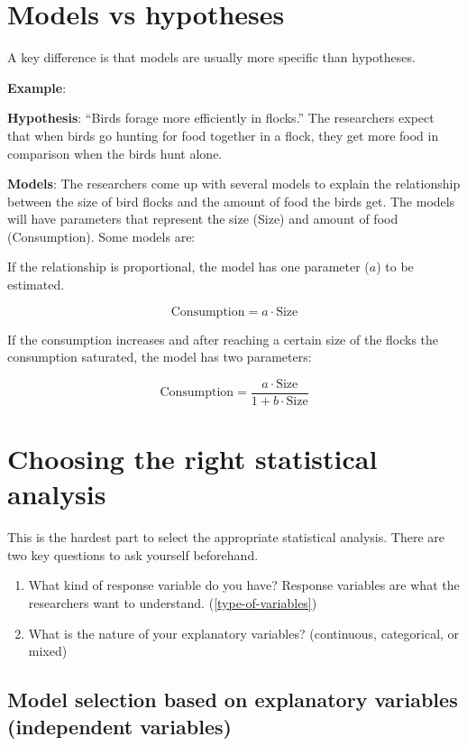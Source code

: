 \documentclass[
]{book}
\begin{document}
\section{Models vs hypotheses}\label{models-vs-hypotheses}

A key difference is that models are usually more specific than hypotheses.

\textbf{Example}:

\textbf{Hypothesis}: ``Birds forage more efficiently in flocks.'' The researchers expect that when birds go hunting for food together in a flock, they get more food in comparison when the birds hunt alone.

\textbf{Models}: The researchers come up with several models to explain the relationship between the size of bird flocks and the amount of food the birds get. The models will have parameters that represent the size (Size) and amount of food (Consumption). Some models are:

If the relationship is proportional, the model has one parameter (\(a\)) to be estimated.

\[\text{Consumption} = a \cdot \text{Size}\]

If the consumption increases and after reaching a certain size of the flocks the consumption saturated, the model has two parameters:

\[\text{Consumption} = \frac{a \cdot \text{Size}}{1 + b \cdot \text{Size}}\]

\section{Choosing the right statistical analysis}\label{choosing-the-right-statistical-analysis}

This is the hardest part to select the appropriate statistical analysis. There are two key questions to ask yourself beforehand.

\begin{enumerate}
\def\labelenumi{\arabic{enumi}.}
\item
  What kind of response variable do you have?
  Response variables are what the researchers want to understand. (\ref{type-of-variables})
\item
  What is the nature of your explanatory variables? (continuous, categorical, or mixed)
\end{enumerate}

\subsection{Model selection based on explanatory variables (independent variables)}\label{model-selection-based-on-explanatory-variables-independent-variables}
\end{document}
